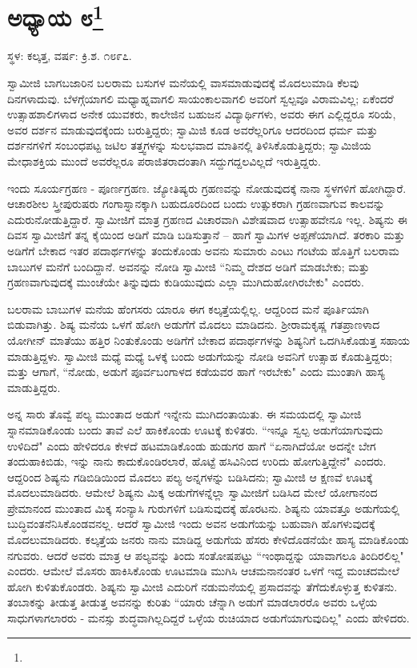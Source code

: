 \newpage

\chapter[ಅಧ್ಯಾಯ ೮]{ಅಧ್ಯಾಯ ೮\protect\footnote{}}

\centerline{ಸ್ಥಳ: ಕಲ್ಕತ್ತ, ವರ್ಷ: ಕ್ರಿ.ಶ. ೧೮೯೭.}

ಸ್ವಾಮೀಜಿ ಬಾಗಬಜಾರಿನ ಬಲರಾಮ ಬಸುಗಳ ಮನೆಯಲ್ಲಿ ವಾಸಮಾಡುವುದಕ್ಕೆ ಮೊದಲುಮಾಡಿ ಕೆಲವು ದಿನಗಳಾದುವು. ಬೆಳಗ್ಗೆಯಾಗಲಿ ಮಧ್ಯಾಹ್ನವಾಗಲಿ ಸಾಯಂಕಾಲವಾಗಲಿ ಅವರಿಗೆ ಸ್ವಲ್ಪವೂ ವಿರಾಮವಿಲ್ಲ; ಏಕೆಂದರೆ ಉತ್ಸಾಹಶಾಲಿಗಳಾದ ಅನೇಕ ಯುವಕರು, ಕಾಲೇಜಿನ ಬಹುಜನ ವಿದ್ಯಾರ್ಥಿಗಳು, ಅವರು ಈಗ ಎಲ್ಲಿದ್ದರೂ ಸರಿಯೆ, ಅವರ ದರ್ಶನ ಮಾಡುವುದಕ್ಕೆಂದು ಬರುತ್ತಿದ್ದರು; ಸ್ವಾಮಿಜಿ ಕೂಡ ಅವರೆಲ್ಲರಿಗೂ ಆದರದಿಂದ ಧರ್ಮ ಮತ್ತು ದರ್ಶನಗಳಿಗೆ ಸಂಬಂಧಪಟ್ಟ ಜಟಿಲ ತತ್ತ್ವಗಳನ್ನು ಸುಲಭವಾದ ಮಾತಿನಲ್ಲಿ ತಿಳಿಸಿಕೊಡುತ್ತಿದ್ದರು; ಸ್ವಾಮಿಜಿಯ ಮೇಧಾಶಕ್ತಿಯ ಮುಂದೆ ಅವರೆಲ್ಲರೂ ಪರಾಜಿತರಾದಂತಾಗಿ ಸದ್ದುಗದ್ದಲವಿಲ್ಲದೆ ಇರುತ್ತಿದ್ದರು.

ಇಂದು ಸೂರ್ಯಗ್ರಹಣ - ಪೂರ್ಣಗ್ರಹಣ. ಜ್ಯೋತಿಷ್ಯರು ಗ್ರಹಣವನ್ನು ನೋಡುವುದಕ್ಕೆ ನಾನಾ ಸ್ಥಳಗಳಿಗೆ ಹೋಗಿದ್ದಾರೆ. ಆಚಾರಶೀಲ ಸ್ತ್ರೀಪುರುಷರು ಗಂಗಾಸ್ನಾನಕ್ಕಾಗಿ ಬಹುದೂರದಿಂದ ಬಂದು ಉತ್ಸುಕರಾಗಿ ಗ್ರಹಣವಾಗುವ ಕಾಲವನ್ನು ಎದುರುನೋಡುತ್ತಿದ್ದಾರೆ. ಸ್ವಾಮೀಜಿಗೆ ಮಾತ್ರ ಗ್ರಹಣದ ವಿಚಾರವಾಗಿ ವಿಶೇಷವಾದ ಉತ್ಸಾಹವೇನೂ ಇಲ್ಲ. ಶಿಷ್ಯನು ಈ ದಿವಸ ಸ್ವಾಮೀಜಿಗೆ ತನ್ನ ಕೈಯಿಂದ ಅಡಿಗೆ ಮಾಡಿ ಬಡಿಸುತ್ತಾನೆ – ಹಾಗೆ ಸ್ವಾಮಿಗಳ ಅಪ್ಪಣೆಯಾಗಿದೆ. ತರಕಾರಿ ಮತ್ತು ಅಡಿಗೆಗೆ ಬೇಕಾದ ಇತರ ಪದಾರ್ಥಗಳನ್ನು ತಂದುಕೊಂಡು ಅವನು ಸುಮಾರು ಎಂಟು ಗಂಟೆಯ ಹೊತ್ತಿಗೆ ಬಲರಾಮ ಬಾಬುಗಳ ಮನೆಗೆ ಬಂದಿದ್ದಾನೆ. ಅವನನ್ನು ನೋಡಿ ಸ್ವಾಮೀಜಿ “ನಿಮ್ಮ ದೇಶದ ಅಡಿಗೆ ಮಾಡಬೇಕು; ಮತ್ತು ಗ್ರಹಣವಾಗುವುದಕ್ಕೆ ಮುಂಚೆಯೇ ತಿನ್ನುವುದು ಕುಡಿಯುವುದು ಎಲ್ಲಾ ಮುಗಿದುಹೋಗಿರಬೇಕು" ಎಂದರು.

ಬಲರಾಮ ಬಾಬುಗಳ ಮನೆಯ ಹೆಂಗಸರು ಯಾರೂ ಈಗ ಕಲ್ಕತ್ತೆಯಲ್ಲಿಲ್ಲ. ಆದ್ದರಿಂದ ಮನೆ ಪೂರ್ತಿಯಾಗಿ ಬಿಡುವಾಗಿತ್ತು. ಶಿಷ್ಯ ಮನೆಯ ಒಳಗೆ ಹೋಗಿ ಅಡುಗೆಗೆ ಮೊದಲು ಮಾಡಿದನು. ಶ‍್ರೀರಾಮಕೃಷ್ಣ ಗತಪ್ರಾಣಳಾದ ಯೋಗೀನ್ ಮಾತೆಯು ಹತ್ತಿರ ನಿಂತುಕೊಂಡು ಅಡಿಗೆಗೆ ಬೇಕಾದ ಪದಾರ್ಥಗಳನ್ನು ಶಿಷ್ಯನಿಗೆ ಒದಗಿಸಿಕೊಡುತ್ತ ಸಹಾಯ ಮಾಡುತ್ತಿದ್ದಳು. ಸ್ವಾಮೀಜಿ ಮಧ್ಯೆ ಮಧ್ಯೆ ಒಳಕ್ಕೆ ಬಂದು ಅಡುಗೆಯನ್ನು ನೋಡಿ ಅವನಿಗೆ ಉತ್ಸಾಹ ಕೊಡುತ್ತಿದ್ದರು; ಮತ್ತು ಆಗಾಗೆ, “ನೋಡು, ಅಡುಗೆ ಪೂರ್ವಬಂಗಾಳದ ಕಡೆಯವರ ಹಾಗೆ ಇರಬೇಕು" ಎಂದು ಮುಂತಾಗಿ ಹಾಸ್ಯ ಮಾಡುತ್ತಿದ್ದರು.

ಅನ್ನ ಸಾರು ತೊವ್ವೆ ಪಲ್ಯ ಮುಂತಾದ ಅಡುಗೆ ಇನ್ನೇನು ಮುಗಿದಂತಾಯಿತು. ಈ ಸಮಯದಲ್ಲಿ ಸ್ವಾಮೀಜಿ ಸ್ನಾನಮಾಡಿಕೊಂಡು ಬಂದು ತಾವೆ ಎಲೆ ಹಾಕಿಕೊಂಡು ಊಟಕ್ಕೆ ಕುಳಿತರು. “ಇನ್ನೂ ಸ್ವಲ್ಪ ಅಡುಗೆಯಾಗುವುದು ಉಳಿದಿದೆ" ಎಂದು ಹೇಳಿದರೂ ಕೇಳದೆ ಹಟಮಾಡಿಕೊಂಡು ಹುಡುಗರ ಹಾಗೆ “ಏನಾಗಿದೆಯೋ ಅದನ್ನೇ ಬೇಗ ತಂದುಹಾಕಿಬಿಡು, ಇನ್ನು ನಾನು ಕಾದುಕೊಂಡಿರಲಾರೆ, ಹೊಟ್ಟೆ ಹಸಿವಿನಿಂದ ಉರಿದು ಹೋಗುತ್ತಿದ್ದೇನೆ" ಎಂದರು. ಆದ್ದರಿಂದ ಶಿಷ್ಯನು ಗಡಿಬಿಡಿಯಿಂದ ಮೊದಲು ಪಲ್ಯ ಅನ್ನಗಳನ್ನು ಬಡಿಸಿದನು; ಸ್ವಾಮೀಜಿ ಆ ಕ್ಷಣವೆ ಊಟಕ್ಕೆ ಮೊದಲುಮಾಡಿದರು. ಆಮೇಲೆ ಶಿಷ್ಯನು ಮಿಕ್ಕ ಅಡುಗೆಗಳನ್ನೆಲ್ಲಾ ಸ್ವಾಮೀಜಿಗೆ ಬಡಿಸಿದ ಮೇಲೆ ಯೋಗಾನಂದ ಪ್ರೇಮಾನಂದ ಮುಂತಾದ ಮಿಕ್ಕ ಸಂನ್ಯಾಸಿ ಗುರುಗಳಿಗೆ ಬಡಿಸುವುದಕ್ಕೆ ಹೊರಟನು. ಶಿಷ್ಯನು ಯಾವತ್ತೂ ಅಡುಗೆಯಲ್ಲಿ ಬುದ್ಧಿವಂತನೆನಿಸಿಕೊಂಡವನಲ್ಲ. ಆದರೆ ಸ್ವಾಮೀಜಿ ಇಂದು ಅವನ ಅಡುಗೆಯನ್ನು ಬಹುವಾಗಿ ಹೊಗಳುವುದಕ್ಕೆ ಮೊದಲುಮಾಡಿದರು. ಕಲ್ಕತ್ತೆಯ ಜನರು ನಾನು ಮಾಡಿದ್ದ ಅಡುಗೆಯ ಹೆಸರು ಕೇಳಿದೊಡನೆಯೇ ಹಾಸ್ಯ ಮಾಡಿಕೊಂಡು ನಗುವರು. ಆದರೆ ಅವರು ಮಾತ್ರ ಆ ಪಲ್ಯವನ್ನು ತಿಂದು ಸಂತೋಷಪಟ್ಟು “ಇಂಥಾದ್ದನ್ನು ಯಾವಾಗಲೂ ತಿಂದಿರಲಿಲ್ಲ" ಎಂದರು. ಆಮೇಲೆ ಮೊಸರು ಹಾಕಿಸಿಕೊಂಡು ಊಟಮಾಡಿ ಮುಗಿಸಿ ಆಚಮನಾನಂತರ ಒಳಗೆ ಇದ್ದ ಮಂಚದಮೇಲೆ ಹೋಗಿ ಕುಳಿತುಕೊಂಡರು. ಶಿಷ್ಯನು ಸ್ವಾಮೀಜಿ ಎದುರಿಗೆ ನಡುಮನೆಯಲ್ಲಿ ಪ್ರಸಾದವನ್ನು ತೆಗೆದುಕೊಳ್ಳುತ್ತ ಕುಳಿತನು. ತಂಬಾಕನ್ನು ತೀಡುತ್ತ ತೀಡುತ್ತ ಅವನನ್ನು ಕುರಿತು “ಯಾರು ಚೆನ್ನಾಗಿ ಅಡುಗೆ ಮಾಡಲಾರರೊ ಅವರು ಒಳ್ಳೆಯ ಸಾಧುಗಳಾಗಲಾರರು - ಮನಸ್ಸು ಶುದ್ಧವಾಗಿಲ್ಲದಿದ್ದರೆ ಒಳ್ಳೆಯ ರುಚಿಯಾದ ಅಡುಗೆಯಾಗುವುದಿಲ್ಲ" ಎಂದು ಹೇಳಿದರು.

